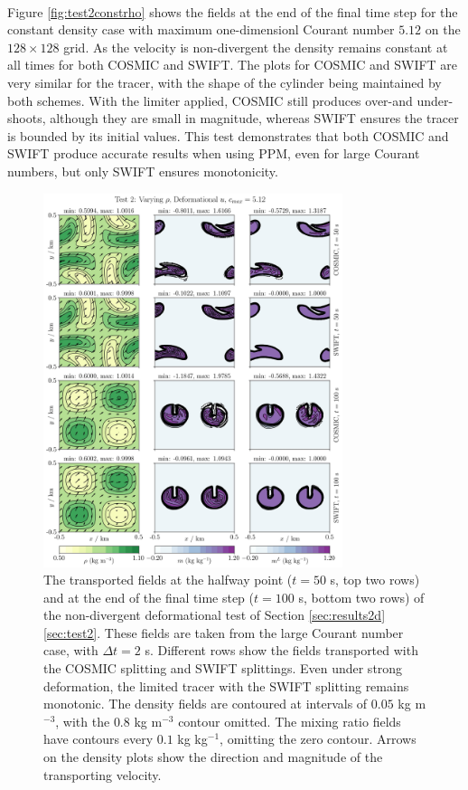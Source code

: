 \documentclass{ametsocV6.1}
\begin{document}
\\
Figure \ref{fig:test2constrho} shows the fields at the end of the final time step for the constant density case with maximum one-dimensionl Courant number $5.12$ on the $128\times128$ grid. As the velocity is non-divergent the density remains constant at all times for both COSMIC and SWIFT. The plots for COSMIC and SWIFT are very similar for the tracer, with the shape of the cylinder being maintained by both schemes. With the limiter applied, COSMIC still produces over-and under-shoots, although they are small in magnitude, whereas SWIFT ensures the tracer is bounded by its initial values. This test demonstrates that both COSMIC and SWIFT produce accurate results when using PPM, even for large Courant numbers, but only SWIFT ensures monotonicity. \\
\begin{figure}[ht!]
\centering
\includegraphics[width=0.78\textwidth]{fig_4_deformational.jpg}
\caption{The transported fields at the halfway point ($t=50$ s, top two rows) and at the end of the final time step ($t=100$ s, bottom two rows) of the non-divergent deformational test of Section \ref{sec:results2d}\ref{sec:test2}. These fields are taken from the large Courant number case, with $\Delta t=2$ s. Different rows show the fields transported with the COSMIC splitting and SWIFT splittings.
Even under strong deformation, the limited tracer with the SWIFT splitting remains monotonic.
The density fields are contoured at intervals of $0.05$ kg m$^{-3}$, with the $0.8$ kg m$^{-3}$ contour omitted.
The mixing ratio fields have contours every $0.1$ kg kg$^{-1}$, omitting the zero contour.
Arrows on the density plots show the direction and magnitude of the transporting velocity.}\label{fig:test2}
\end{figure} 
\end{document}
